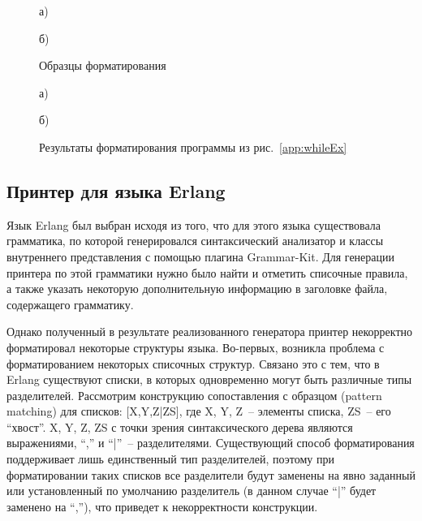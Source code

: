 \begin{figure}[h]
  \noindent
  \begin{minipage}{.4\textwidth}
    
    \vspace{1cm}
    \caption*{а)}    
  \end{minipage}
  \hfill
  \begin{minipage}{.5\textwidth}
    
    \caption*{б)}
  \end{minipage}
  \caption{Образцы форматирования}
  \label{app:whileTs}
\end{figure}

\begin{figure}[h]
  \noindent
  \begin{minipage}{.4\textwidth}
    
    \vspace{.3cm}
    \caption*{а)}    
  \end{minipage}
  \hfill
  \begin{minipage}{.5\textwidth}
    
    \caption*{б)}    
  \end{minipage}
  \caption{Результаты форматирования программы из рис.~\ref{app:whileEx}}
  \label{app:whileRess}
\end{figure}

\subsection{Принтер для языка Erlang}
Язык Erlang был выбран исходя из того, что для этого языка существовала грамматика, по которой генерировался синтаксический анализатор и классы внутреннего представления с помощью плагина Grammar-Kit.
Для генерации принтера по этой грамматики нужно было найти и отметить списочные правила, а также указать некоторую дополнительную информацию в заголовке файла, содержащего грамматику.

Однако полученный в результате реализованного генератора принтер некорректно форматировал некоторые структуры языка.
Во-первых, возникла проблема с форматированием некоторых списочных структур.
Связано это с тем, что в Erlang существуют списки, в которых одновременно могут быть различные типы разделителей.
Рассмотрим конструкцию сопоставления с образцом (pattern matching) для списков: [X,Y,Z|ZS], где X, Y, Z~-- элементы списка, ZS~-- его ``хвост''.
X, Y, Z, ZS с точки зрения синтаксического дерева являются выражениями, ``,'' и ``|''~-- разделителями.
Существующий способ форматирования поддерживает лишь единственный тип разделителей, поэтому при форматировании таких списков все разделители будут заменены на явно заданный или установленный по умолчанию разделитель (в данном случае ``|'' будет заменено на ``,''), что приведет к некорректности конструкции.

